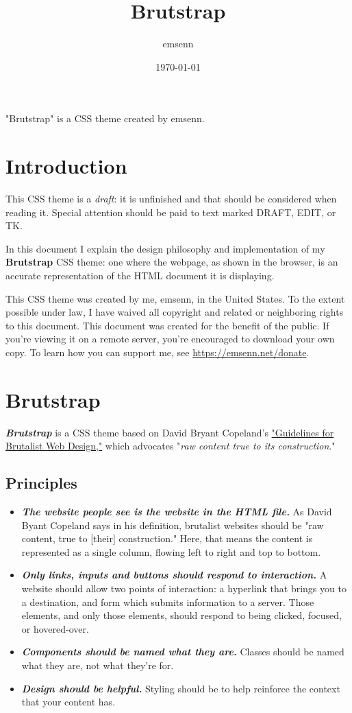\documentclass[11pt]{article}
\author{emsenn}
\date{\today}
\title{Brutstrap}
\begin{document}
\maketitle
"Brutstrap" is a CSS theme created by emsenn.
\setcounter{tocdepth}{4}
\tableofcontents
\section*{Introduction}
\label{sec:org217eb41}
This CSS theme is a \emph{draft}: it is unfinished and that should be considered when reading it. Special attention should be paid to text marked DRAFT, EDIT, or TK.

In this document I explain the design philosophy and implementation of
my \textbf{Brutstrap} CSS theme: one where the webpage, as shown in the
browser, is an accurate representation of the HTML document it is
displaying.

This CSS theme was created by me, emsenn, in the United States. To the extent possible under law, I have waived all copyright and related or neighboring rights to this document. This document was created for the benefit of the public. If you're viewing it on a remote server, you're encouraged to download your own copy. To learn how you can support me, see \href{https://emsenn.net/donate}{https://emsenn.net/donate}.
\section*{Brutstrap}
\label{sec:org6d6db56}
\textbf{\emph{Brutstrap}} is a CSS theme based on David Bryant Copeland's
\href{https://brutalist-web.design/}{"Guidelines for Brutalist Web Design,"} which advocates "\emph{raw content
true to its construction}."
\subsection*{Principles}
\label{sec:orgdcd5133}
\begin{itemize}
\item \textbf{\emph{The website people see is the website in the HTML file.}} As David
Byant Copeland says in his definition, brutalist websites should be
"raw content, true to [their] construction." Here, that means the
content is represented as a single column, flowing left to right and
top to bottom.
\item \textbf{\emph{Only links, inputs and buttons should respond to interaction.}} A
website should allow two points of interaction: a hyperlink that
brings you to a destination, and form which submits information to a
server. Those elements, and only those elements, should respond to
being clicked, focused, or hovered-over.
\item \textbf{\emph{Components should be named what they are.}} Classes should be
named what they are, not what they're for.
\item \textbf{\emph{Design should be helpful.}} Styling should be to help reinforce
the context that your content has.
\end{itemize}
\end{document}
